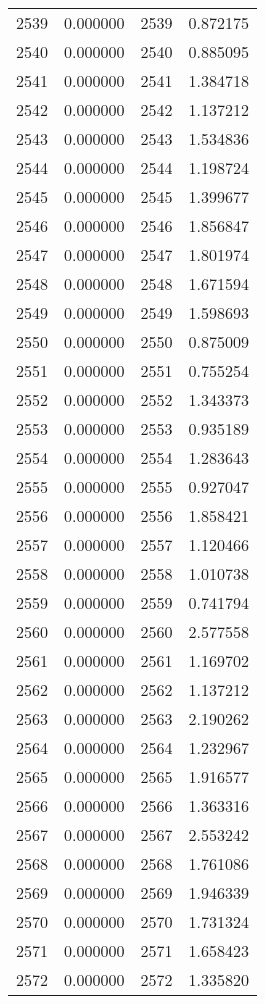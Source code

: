 \documentclass[12pt]{article}
\begin{document}
\begin{longtable}{@{}cccc@{}}
2539 & 0.000000 & 2539 & 0.872175 \\
2540 & 0.000000 & 2540 & 0.885095 \\
2541 & 0.000000 & 2541 & 1.384718 \\
2542 & 0.000000 & 2542 & 1.137212 \\
2543 & 0.000000 & 2543 & 1.534836 \\
2544 & 0.000000 & 2544 & 1.198724 \\
2545 & 0.000000 & 2545 & 1.399677 \\
2546 & 0.000000 & 2546 & 1.856847 \\
2547 & 0.000000 & 2547 & 1.801974 \\
2548 & 0.000000 & 2548 & 1.671594 \\
2549 & 0.000000 & 2549 & 1.598693 \\
2550 & 0.000000 & 2550 & 0.875009 \\
2551 & 0.000000 & 2551 & 0.755254 \\
2552 & 0.000000 & 2552 & 1.343373 \\
2553 & 0.000000 & 2553 & 0.935189 \\
2554 & 0.000000 & 2554 & 1.283643 \\
2555 & 0.000000 & 2555 & 0.927047 \\
2556 & 0.000000 & 2556 & 1.858421 \\
2557 & 0.000000 & 2557 & 1.120466 \\
2558 & 0.000000 & 2558 & 1.010738 \\
2559 & 0.000000 & 2559 & 0.741794 \\
2560 & 0.000000 & 2560 & 2.577558 \\
2561 & 0.000000 & 2561 & 1.169702 \\
2562 & 0.000000 & 2562 & 1.137212 \\
2563 & 0.000000 & 2563 & 2.190262 \\
2564 & 0.000000 & 2564 & 1.232967 \\
2565 & 0.000000 & 2565 & 1.916577 \\
2566 & 0.000000 & 2566 & 1.363316 \\
2567 & 0.000000 & 2567 & 2.553242 \\
2568 & 0.000000 & 2568 & 1.761086 \\
2569 & 0.000000 & 2569 & 1.946339 \\
2570 & 0.000000 & 2570 & 1.731324 \\
2571 & 0.000000 & 2571 & 1.658423 \\
2572 & 0.000000 & 2572 & 1.335820 \\

\end{longtable}
\end{document}
